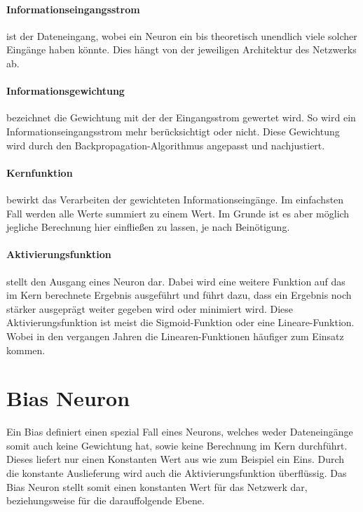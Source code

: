 \paragraph{Informationseingangsstrom} ist der Dateneingang, wobei ein Neuron ein bis theoretisch unendlich viele solcher Eingänge haben könnte. 
Dies hängt von der jeweiligen Architektur des Netzwerks ab.

\paragraph{Informationsgewichtung} bezeichnet die Gewichtung mit der der Eingangsstrom gewertet wird. 
So wird ein Informationseingangsstrom mehr berücksichtigt oder nicht. 
Diese Gewichtung wird durch den Backpropagation-Algorithmus angepasst und nachjustiert.

\paragraph{Kernfunktion} bewirkt das Verarbeiten der gewichteten Informationseingänge. 
Im einfachsten Fall werden alle Werte summiert zu einem Wert. 
Im Grunde ist es aber möglich jegliche Berechnung hier einfließen zu lassen, je nach Beinötigung.

\paragraph{Aktivierungsfunktion} stellt den Ausgang eines Neuron dar. 
Dabei wird eine weitere Funktion auf das im Kern berechnete Ergebnis ausgeführt und führt dazu, dass ein Ergebnis noch stärker ausgeprägt weiter gegeben wird oder minimiert wird. 
Diese Aktivierungsfunktion ist meist die Sigmoid-Funktion oder eine Lineare-Funktion. 
Wobei in den vergangen Jahren die Linearen-Funktionen häufiger zum Einsatz kommen.

\section{Bias Neuron}

Ein Bias definiert einen spezial Fall eines Neurons, welches weder Dateneingänge somit auch keine Gewichtung hat, sowie keine Berechnung im Kern durchführt. 
Dieses liefert nur einen Konstanten Wert aus wie zum Beispiel ein Eins. 
Durch die konstante Auslieferung wird auch die Aktivierungsfunktion überflüssig. 
Das Bias Neuron stellt somit einen konstanten Wert für das Netzwerk dar, beziehungsweise für die darauffolgende Ebene.

